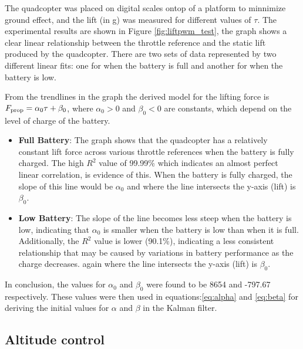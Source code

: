 \documentclass{article}
\begin{document}
The quadcopter was placed on digital scales ontop of a platform to minnimize ground effect, and the lift (in g) was measured for different values of \(\tau\).
The experimental results are shown in Figure \ref{fig:liftpwm_test}, the graph shows a clear linear relationship between the throttle reference and the static lift produced by the 
quadcopter. There are two sets of data represented by two different linear fits: one for when the battery is full and another for when the battery is low.

From the trendlines in the graph the derived model for the lifting force is \(F_{\rm prop} = \alpha_0 \tau + \beta_0\), where $\alpha_0>0$ and $\beta_0<0$ are constants, 
which depend on the level of charge of the battery.

\begin{itemize}
  \item \textbf{Full Battery}: The graph shows that the quadcopter has a relatively constant lift force across various throttle references when the battery is fully charged. The high 
    \(R^2\) value of 99.99\% which indicates an almost perfect linear correlation, is evidence of this. When the battery is fully charged, the slope of this line would be \(\alpha_0\)
    and where the line intersects the y-axis (lift) is \(\beta_0\).
  \item \textbf{Low Battery}: The slope of the line becomes less steep when the battery is low, indicating that \(\alpha_0\) is smaller when the battery is low than when it is full.
    Additionally, the \(R^2\) value is lower (90.1\%), indicating a less consistent relationship that may be caused by variations in battery performance as the charge decreases. again 
    where the line intersects the y-axis (lift) is \(\beta_0\).
\end{itemize}
In conclusion, the values for \(\alpha_0\) and \(\beta_0\) were found to be 8654 and -797.67 respectively. These values were then used in equations:\ref{eq:alpha} and \ref{eq:beta} for 
deriving the initial values for \(\alpha\) and \(\beta\) in the Kalman filter.

\subsection{Altitude control}
\end{document}

